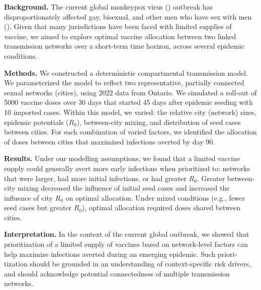 \renewcommand{\emph}[1]{\par\textbf{#1}}
\emph{Background.}
The current global monkeypox virus (\MPXV) outbreak
has disproportionately affected gay, bisexual, and other men who have sex with men (\GBMSM).
Given that many jurisdictions have been faced with limited supplies of \MPXV vaccine,
we aimed to explore optimal vaccine allocation between two linked \GBMSM transmission networks
over a short-term time horizon, across several epidemic conditions.
\emph{Methods.}
We constructed a deterministic compartmental \MPXV transmission model.
We parameterized the model to reflect
two representative, partially connected \GBMSM sexual networks (cities),
using 2022 data from Ontario.
We simulated a roll-out of 5000 vaccine doses over 30 days
that started 45 days after epidemic seeding with 10 imported cases.
Within this model, we varied:
the relative city (network) sizes, epidemic potentials ($R_0$), between-city mixing,
and distribution of seed cases between cities.
For each combination of varied factors, we identified the allocation of doses between cities
that maximized infections averted by day 90.
\emph{Results.}
Under our modelling assumptions, we found that a limited \MPXV vaccine supply
could generally avert more early infections when prioritized to:
networks that were larger, had more initial infections, or had greater $R_0$.
Greater between-city mixing decreased the influence of initial seed cases
and increased the influence of city $R_0$ on optimal allocation.
Under mixed conditions (e.g., fewer seed cases but greater $R_0$),
optimal allocation required doses shared between cities.
\emph{Interpretation.}
In the context of the current global \MPXV outbreak, we showed that
prioritization of a limited supply of vaccines based on network-level factors
can help maximize infections averted during an emerging epidemic.
Such priori­tization should be grounded in an understanding of context-specific risk drivers,
and should acknowledge potential connectedness of multiple transmission networks.
